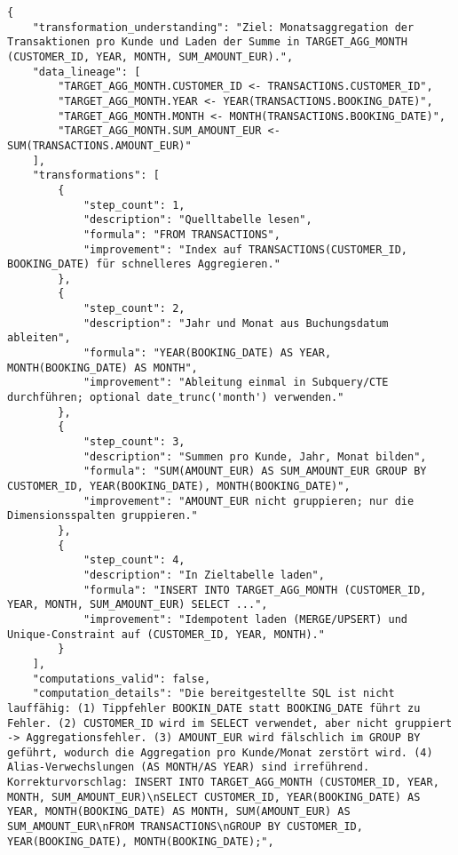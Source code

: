 \begin{lstlisting}[caption={Ausgabe: GPT-5 Anwendungsfall 1 Hauptdurchlauf},label={gpt_case1_prompt1}]
{
    "transformation_understanding": "Ziel: Monatsaggregation der Transaktionen pro Kunde und Laden der Summe in TARGET_AGG_MONTH (CUSTOMER_ID, YEAR, MONTH, SUM_AMOUNT_EUR).",
    "data_lineage": [
        "TARGET_AGG_MONTH.CUSTOMER_ID <- TRANSACTIONS.CUSTOMER_ID",
        "TARGET_AGG_MONTH.YEAR <- YEAR(TRANSACTIONS.BOOKING_DATE)",
        "TARGET_AGG_MONTH.MONTH <- MONTH(TRANSACTIONS.BOOKING_DATE)",
        "TARGET_AGG_MONTH.SUM_AMOUNT_EUR <- SUM(TRANSACTIONS.AMOUNT_EUR)"
    ],
    "transformations": [
        {
            "step_count": 1,
            "description": "Quelltabelle lesen",
            "formula": "FROM TRANSACTIONS",
            "improvement": "Index auf TRANSACTIONS(CUSTOMER_ID, BOOKING_DATE) für schnelleres Aggregieren."
        },
        {
            "step_count": 2,
            "description": "Jahr und Monat aus Buchungsdatum ableiten",
            "formula": "YEAR(BOOKING_DATE) AS YEAR, MONTH(BOOKING_DATE) AS MONTH",
            "improvement": "Ableitung einmal in Subquery/CTE durchführen; optional date_trunc('month') verwenden."
        },
        {
            "step_count": 3,
            "description": "Summen pro Kunde, Jahr, Monat bilden",
            "formula": "SUM(AMOUNT_EUR) AS SUM_AMOUNT_EUR GROUP BY CUSTOMER_ID, YEAR(BOOKING_DATE), MONTH(BOOKING_DATE)",
            "improvement": "AMOUNT_EUR nicht gruppieren; nur die Dimensionsspalten gruppieren."
        },
        {
            "step_count": 4,
            "description": "In Zieltabelle laden",
            "formula": "INSERT INTO TARGET_AGG_MONTH (CUSTOMER_ID, YEAR, MONTH, SUM_AMOUNT_EUR) SELECT ...",
            "improvement": "Idempotent laden (MERGE/UPSERT) und Unique-Constraint auf (CUSTOMER_ID, YEAR, MONTH)."
        }
    ],
    "computations_valid": false,
    "computation_details": "Die bereitgestellte SQL ist nicht lauffähig: (1) Tippfehler BOOKIN_DATE statt BOOKING_DATE führt zu Fehler. (2) CUSTOMER_ID wird im SELECT verwendet, aber nicht gruppiert -> Aggregationsfehler. (3) AMOUNT_EUR wird fälschlich im GROUP BY geführt, wodurch die Aggregation pro Kunde/Monat zerstört wird. (4) Alias-Verwechslungen (AS MONTH/AS YEAR) sind irreführend. Korrekturvorschlag: INSERT INTO TARGET_AGG_MONTH (CUSTOMER_ID, YEAR, MONTH, SUM_AMOUNT_EUR)\nSELECT CUSTOMER_ID, YEAR(BOOKING_DATE) AS YEAR, MONTH(BOOKING_DATE) AS MONTH, SUM(AMOUNT_EUR) AS SUM_AMOUNT_EUR\nFROM TRANSACTIONS\nGROUP BY CUSTOMER_ID, YEAR(BOOKING_DATE), MONTH(BOOKING_DATE);",

\end{lstlisting}
